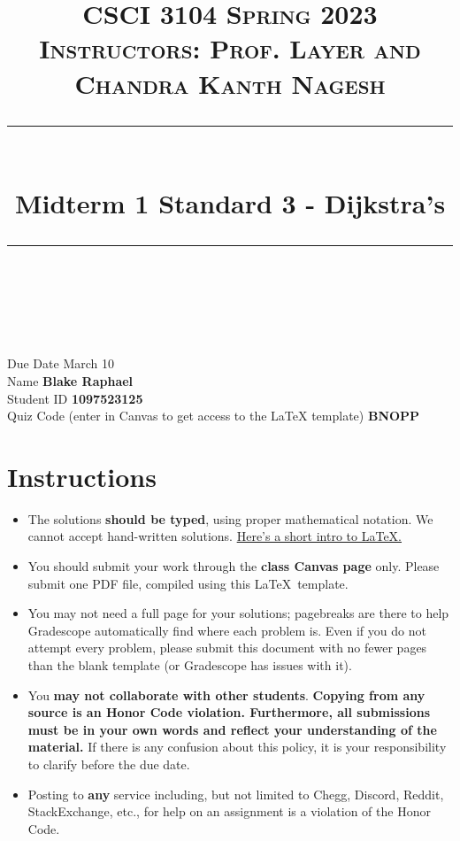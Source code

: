 \documentclass[11pt]{article}
\title{
\normalfont \normalsize 
\textsc{CSCI 3104 Spring 2023 \\
Instructors: Prof. Layer and Chandra Kanth Nagesh} \\
[10pt] 
\rule{\linewidth}{0.5pt} \\[6pt] 
\huge Midterm 1 Standard 3 - Dijkstra's \\
\rule{\linewidth}{2pt}  \\[10pt]
}
\date{}
\theoremstyle{definition}
\theoremstyle{definition}
\theoremstyle{definition}
\begin{document}
\maketitle


\noindent
Due Date \dotfill March 10 \\
Name \dotfill \textbf{Blake Raphael} \\
Student ID \dotfill \textbf{1097523125} \\
Quiz Code (enter in Canvas to get access to the LaTeX template) \dotfill \textbf{BNOPP} \\

\tableofcontents

\section{Instructions}
 \begin{itemize}
	\item The solutions \textbf{should be typed}, using proper mathematical notation. We cannot accept hand-written solutions. \href{http://ece.uprm.edu/~caceros/latex/introduction.pdf}{Here's a short intro to \LaTeX.}
	\item You should submit your work through the \textbf{class Canvas page} only. Please submit one PDF file, compiled using this \LaTeX \ template.
	\item You may not need a full page for your solutions; pagebreaks are there to help Gradescope automatically find where each problem is. Even if you do not attempt every problem, please submit this document with no fewer pages than the blank template (or Gradescope has issues with it).

	\item You \textbf{may not collaborate with other students}. \textbf{Copying from any source is an Honor Code violation. Furthermore, all submissions must be in your own words and reflect your understanding of the material.} If there is any confusion about this policy, it is your responsibility to clarify before the due date. 

	\item Posting to \textbf{any} service including, but not limited to Chegg, Discord, Reddit, StackExchange, etc., for help on an assignment is a violation of the Honor Code.

	\end{itemize}
\end{document}

